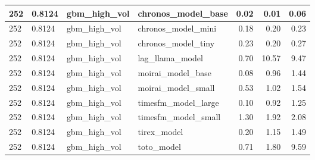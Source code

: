 {\begin{tabular}{llllrrr}
252 & 0.8124 & gbm\_high\_vol & chronos\_model\_base & 0.02 & 0.01 & 0.06 \\
\midrule
252 & 0.8124 & gbm\_high\_vol & chronos\_model\_mini & 0.18 & 0.20 & 0.23 \\
\midrule
252 & 0.8124 & gbm\_high\_vol & chronos\_model\_tiny & 0.23 & 0.20 & 0.27 \\
\midrule
252 & 0.8124 & gbm\_high\_vol & lag\_llama\_model & 0.70 & 10.57 & 9.47 \\
\midrule
252 & 0.8124 & gbm\_high\_vol & moirai\_model\_base & 0.08 & 0.96 & 1.44 \\
\midrule
252 & 0.8124 & gbm\_high\_vol & moirai\_model\_small & 0.53 & 1.02 & 1.54 \\
\midrule
252 & 0.8124 & gbm\_high\_vol & timesfm\_model\_large & 0.10 & 0.92 & 1.25 \\
\midrule
252 & 0.8124 & gbm\_high\_vol & timesfm\_model\_small & 1.30 & 1.92 & 2.08 \\
\midrule
252 & 0.8124 & gbm\_high\_vol & tirex\_model & 0.20 & 1.15 & 1.49 \\
\midrule
252 & 0.8124 & gbm\_high\_vol & toto\_model & 0.71 & 1.80 & 9.59 \\
\bottomrule
\end{tabular}
}